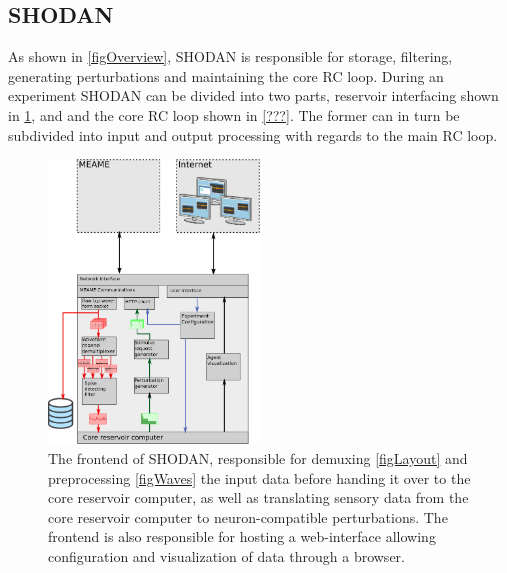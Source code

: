 \subsection{SHODAN}
As shown in \ref{figOverview}, SHODAN is responsible for storage, filtering,
generating perturbations and maintaining the core RC loop.
During an experiment SHODAN can be divided into two parts, reservoir interfacing
shown in \ref{figSHODANiface}, and and the core RC loop shown in \ref{???}.
The former can in turn be subdivided into input and output processing with
regards to the main RC loop.
\begin{figure}[h!]
  \centering
  \includegraphics[width=0.5\textwidth]{fig/SHODANfrontend.png}
  \caption{
    The frontend of SHODAN, responsible for demuxing \ref{figLayout} and
    preprocessing \ref{figWaves} the input data before handing it over to the
    core reservoir computer, as well as translating sensory data from the core
    reservoir computer to neuron-compatible perturbations.
    The frontend is also responsible for hosting a web-interface allowing
    configuration and visualization of data through a browser.
  }
  \label{figSHODANiface}
\end{figure}
